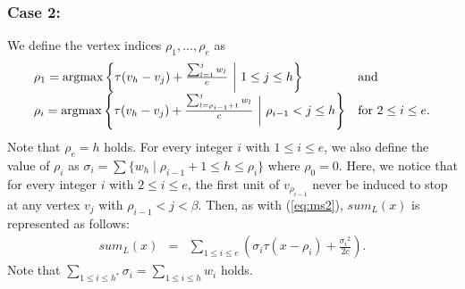 \documentclass[a4paper]{llncs}
\newcommand{\argmax}{\operatornamewithlimits{argmax}}
\begin{document}
\subsubsection{Case 2:}
We define the vertex indices $\rho_1, \ldots, \rho_e$ as
\begin{eqnarray}
\begin{array}{ll}
	\rho_1 = \argmax \left\{ \tau(v_h - v_j) + \frac{\sum_{l=1}^j w_l}{c} \ \bigg| \ 1 \le j \le h \right\}				& \mbox{and} \\
	\rho_i = \argmax \left\{ \tau(v_h - v_j) + \frac{\sum_{l=\rho_{i-1}+1}^j w_l}{c} \ \bigg| \ \rho_{i-1} < j \le h \right\}	& \mbox{for} \ 2 \le i \le e.
    \end{array}
 \label{ms2.5}
\end{eqnarray}
Note that $\rho_e = h$ holds. 
For every integer $i$ with $1 \le i \le e$, we also define the value of $\rho_i$ as $\sigma_i = \sum \{ w_h \mid \rho_{i-1}+1 \le h \le \rho_i \}$ where $\rho_0 = 0$.
Here, we notice that for every integer $i$ with $2 \le i \le e$, the first unit of $v_{\rho_{i-1}}$ never be induced to stop at any vertex $v_j$ with $\rho_{i-1} < j < \beta$.
Then, as with (\ref{eq:ms2}), $sum_L(x)$ is represented as follows:
\begin{eqnarray}
sum_L(x)  	&=& \sum_{1 \le i \le e} \left( \sigma_i\tau(x-\rho_i) + \frac{{\sigma_i}^2}{2c} \right). \label{eq:ms3}
\end{eqnarray}
Note that $\sum_{1 \le i \le h^*} \sigma_i = \sum_{1 \le i \le h} w_i$ holds.



\vspace{4mm}
\end{document}
